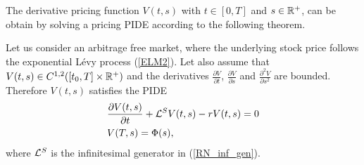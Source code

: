 The derivative pricing function $V(t,s)$ with $t \in [0,T]$ and $s\in \mathbb{R}^+$, can be obtain by solving a pricing PIDE according to the following theorem.
\begin{Theorem}
 Let us consider an arbitrage free market, where the underlying stock price follows the exponential Lévy process (\ref{ELM2}). 
 Let also assume that $V(t,s) \in C^{1,2}([t_0,T] \times \mathbb{R}^+)$ and the derivatives   %
 $\frac{\partial V}{\partial t}$, $\frac{\partial V}{\partial s}$ %
 and $\frac{\partial^2 V}{\partial s^2}$ are bounded.
 Therefore $V(t,s)$ satisfies the PIDE
\begin{align}\label{derivative_PIDE}
 & \frac{\partial V(t,s)}{\partial t} + \mathcal{L}^{S} V(t,s) -r V(t,s) = 0 \\
 & V(T,s) = \Phi(s),
\end{align}
where $\mathcal{L}^S$ is the infinitesimal generator in (\ref{RN_inf_gen}). 
\end{Theorem}
